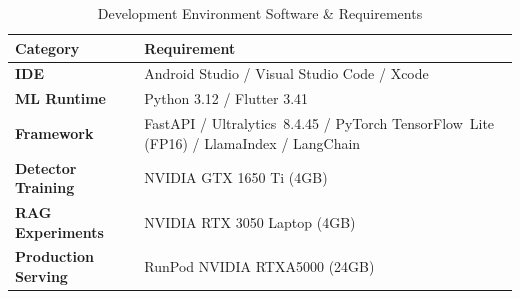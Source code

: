 \begin{table}[htbp]
    \centering
    \caption{Development Environment Software \& Requirements}
    \label{tab:req-devenv}
    \renewcommand{\arraystretch}{1.3}
    \begin{tabular}{>{\bfseries}p{5.5cm} p{6.5cm}}
        \toprule
        \rowcolor{gemsand}
        \textbf{Category} & \textbf{Requirement} \\
        \midrule
        IDE
            & Android Studio / Visual Studio Code / Xcode \\
        ML Runtime
            & Python 3.12 / Flutter 3.41 \\
        Framework
            & FastAPI / Ultralytics~8.4.45 / PyTorch TensorFlow~Lite (FP16) / LlamaIndex / LangChain \\
        Detector Training
            & NVIDIA GTX 1650 Ti (4GB) \\
        RAG Experiments
            &  NVIDIA RTX 3050 Laptop (4GB) \\
        Production Serving
            &  RunPod NVIDIA RTXA5000 (24GB) \\
        \bottomrule
    \end{tabular}
\end{table}


